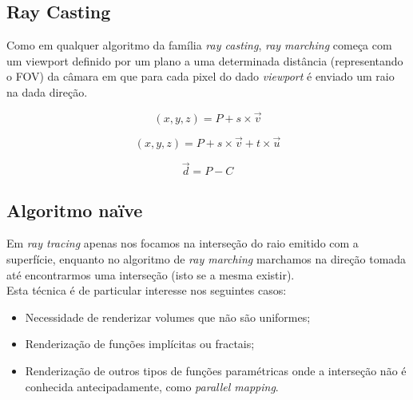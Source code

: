 \subsection{Ray Casting}
Como em qualquer algoritmo da família \textit{ray casting}, \textit{ray marching} começa com um viewport definido por um plano a uma determinada distância (representando o \ac{FOV}) da câmara em que para cada pixel do dado \textit{viewport} é enviado um raio na dada direção.

\begin{equation}
    (x, y, z) = P + s \times \overrightarrow{v}
\end{equation}

\begin{equation}
    (x, y, z) = P + s \times \overrightarrow{v} + t \times \overrightarrow{u}
\end{equation}

\begin{equation}
    \overrightarrow{d} = P - C
\end{equation}




\subsection{Algoritmo naïve}
Em \textit{ray tracing} apenas nos focamos na interseção do raio emitido com a superfície, enquanto no algoritmo de \textit{ray marching} marchamos na direção tomada até encontrarmos uma interseção (isto se a mesma existir).\\

Esta técnica é de particular interesse nos seguintes casos:
\begin{itemize}
    \item Necessidade de renderizar volumes que não são uniformes;
    \item Renderização de funções implícitas ou fractais;
    \item Renderização de outros tipos de funções paramétricas onde a interseção não é conhecida antecipadamente, como \textit{parallel mapping}.
\end{itemize}

% 
% 
% 	
% 	
% 	

